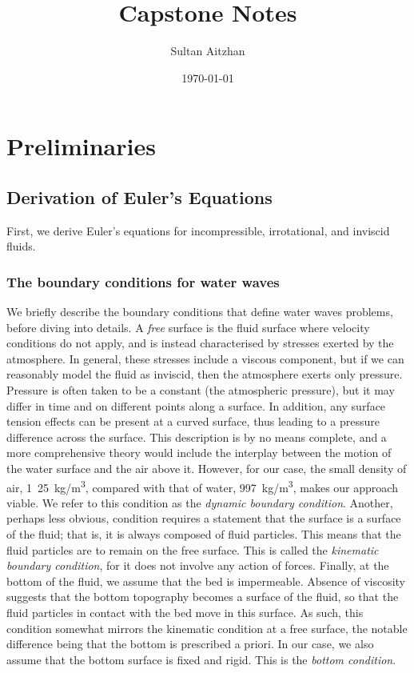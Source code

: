 \documentclass[10pt,reqno,oneside,a4paper]{article}
\author{Sultan Aitzhan}
\title{Capstone Notes}
\date{\today}
\begin{document}
\maketitle
\thispagestyle{fancy}
\tableofcontents

\section{Preliminaries}

\subsection{Derivation of Euler's Equations}
First, we derive Euler's equations for incompressible, irrotational, and inviscid fluids. 

\subsubsection{The boundary conditions for water waves}

We briefly describe the boundary conditions that define water waves problems, before diving into details. A \emph{free} surface is the fluid surface where velocity conditions do not apply, and is instead characterised by stresses exerted by the atmosphere. In general, these stresses include a viscous component, but if we can reasonably model the fluid as inviscid, then the atmosphere exerts only pressure. Pressure is often taken to be a constant (the atmospheric pressure), but it may differ in time and on different points along a surface. In addition, any surface tension effects can be present at a curved surface, thus leading to a pressure difference across the surface. This description is by no means complete, and a more comprehensive theory would include the interplay between the motion of the water surface and the air above it. However, for our case, the small density of air, \si[per-mode=symbol]{1.25 \kilogram\per\meter\cubed}, compared with that of water, \si[per-mode=symbol]{997 \kilogram\per\meter\cubed}, makes our approach viable. We refer to this condition as the \emph{dynamic boundary condition}. Another, perhaps less obvious, condition requires a statement that the surface is a surface of the fluid; that is, it is always composed of fluid particles. This means that the fluid particles are to remain on the free surface. This is called the \emph{kinematic boundary condition}, for it does not involve any action of forces. Finally, at the bottom of the fluid, we assume that the bed is impermeable. Absence of viscosity suggests that the bottom topography becomes a surface of the fluid, so that the fluid particles in contact with the bed move in this surface. As such, this condition somewhat mirrors the kinematic condition at a free surface, the notable difference being that the bottom is prescribed a priori. In our case, we also assume that the bottom surface is fixed and rigid. This is the \emph{bottom condition}.
\end{document}
